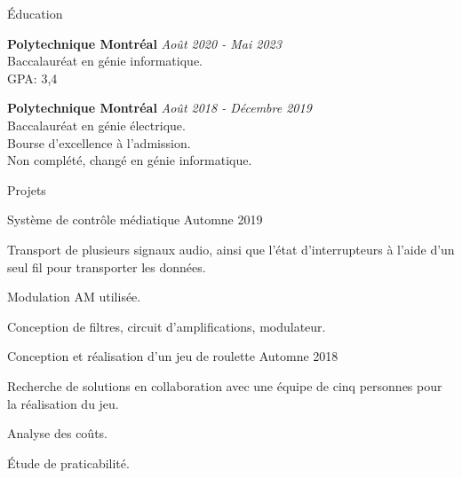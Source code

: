 \documentclass{resume} %
\begin{document}
	

	\begin{rSection}{Éducation}
		
		{\bf Polytechnique Montréal} \hfill {\em Août 2020 - Mai 2023} 
		\\ Baccalauréat en génie informatique.
		\\  GPA: 3,4
		
		{\bf Polytechnique Montréal} \hfill {\em Août 2018 - Décembre 2019} 
		\\ Baccalauréat en génie électrique.
		\\   Bourse d'excellence à l'admission.
		\\		Non complété, changé en génie informatique.
	\end{rSection}
	
	\begin{rSection}{Projets}
		
		\begin{rSubsection}{Système de contrôle médiatique }{Automne 2019}{}{}
			\item   Transport de plusieurs signaux audio, ainsi que l'état d'interrupteurs à l'aide d'un seul fil pour transporter les données.
			\item   Modulation AM utilisée.
			\item Conception de filtres, circuit d'amplifications, modulateur.
			
		\end{rSubsection}
		
%			
		
		\begin{rSubsection}{Conception et réalisation d’un jeu de roulette }{Automne 2018}{}{}
			\item  Recherche de solutions en collaboration avec une équipe de cinq personnes pour la réalisation du jeu.
			\item  Analyse des coûts.
			\item  Étude de praticabilité.
		\end{rSubsection} 
		
	\end{rSection}
	
\end{document}
